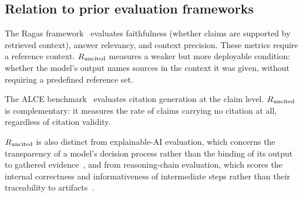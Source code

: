 \subsection{Relation to prior evaluation frameworks}

The Ragas framework~\cite{arxiv230915217} evaluates faithfulness (whether claims are supported by
retrieved context), answer relevancy, and context precision. These metrics require a reference context.
$R_{\mathrm{uncited}}$ measures a weaker but more deployable condition: whether the model's output names sources
in the context it was given, without requiring a predefined reference set.

The ALCE benchmark~\cite{arxiv230514627} evaluates citation generation at the claim level. $R_{\mathrm{uncited}}$
is complementary: it measures the rate of claims carrying no citation at all, regardless of citation
validity.

$R_{\mathrm{uncited}}$ is also distinct from explainable-AI evaluation, which concerns the transparency of a
model's decision process rather than the binding of its output to gathered evidence~\cite{clinciu2019survey},
and from reasoning-chain evaluation, which scores the internal correctness and informativeness of
intermediate steps rather than their traceability to artifacts~\cite{arxiv230410703}.
